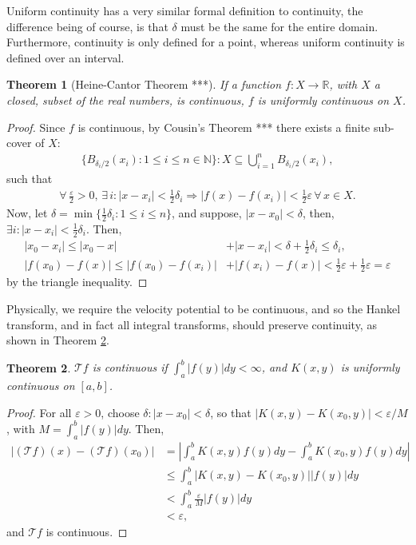 \documentclass[12pt]{article}
\newtheorem{theorem}{Theorem}[section]
\begin{document}
Uniform continuity has a very similar formal definition to continuity, the difference being of course, is that  $\delta$ must be the same for the entire domain. Furthermore, continuity is only defined for a point, whereas uniform continuity is defined over an interval.

\begin{theorem}[Heine-Cantor Theorem ***]
If a function $f: X \rightarrow \mathbb{R}$, with $X$ a closed, subset of the real numbers, is continuous, $f$ is uniformly continuous on $X$.
\label{thm:uniform}
\end{theorem}
\begin{proof}
Since $f$ is continuous, by Cousin's Theorem *** there exists a finite sub-cover of $X$:
\begin{align*}
\{ B_{\delta_i/2} (x_i) : 1 \leq i \leq n \in \mathbb{N} \} : X \subseteq \bigcup_{i=1}^n B_{\delta_i/2}(x_i),
\end{align*}
such that
\begin{align*}
\forall \, \frac{\varepsilon}{2} > 0, \, \exists \, i : |x-x_i| < \frac{1}{2} \delta_i \Rightarrow |f(x)-f(x_i)| < \frac{1}{2}\varepsilon \, \forall \, x \in X.
\end{align*}
Now, let $\delta = \min \{ \frac{1}{2} \delta_i : 1 \leq i \leq n \}$, and suppose, $|x-x_0| < \delta$, then, $\exists i : |x-x_i| < \frac{1}{2}\delta_i$.  Then,
\begin{align*}
|x_0-x_i| \leq |x_0-x| &+ |x-x_i| < \delta + \frac{1}{2}\delta_i \leq \delta_i, \\
|f(x_0)-f(x)| \leq |f(x_0)-f(x_i)| &+ |f(x_i)-f(x)| < \frac{1}{2}\varepsilon + \frac{1}{2}\varepsilon = \varepsilon
\end{align*}
by the triangle inequality.
\end{proof}

Physically, we require the velocity potential to be continuous, and so the Hankel transform, and in fact all integral transforms, should preserve continuity, as shown in Theorem \ref{thm:continuity}.

\begin{theorem}
\label{thm:continuity}
$\mathcal{T}f$ is continuous if $\int_a^b |f(y)| dy < \infty$, and $K(x,y)$ is uniformly continuous on $[a,b]$.
\end{theorem}
\begin{proof}
For all $\varepsilon > 0$, choose $\delta : |x - x_0| < \delta$, so that $|K(x,y) - K(x_0,y)| < \varepsilon/M$, with $M = \int_a^b |f(y)| dy$. Then,
\begin{align*}
|(\mathcal{T}f)(x) - (\mathcal{T}f)(x_0)| &= \left| \int_a^b K(x,y)f(y) dy - \int_a^b K(x_0,y)f(y) dy \right| \\
&\leq \int_a^b |K(x,y) - K(x_0,y)||f(y)| dy \\
&< \int_a^b \frac{\varepsilon}{M} |f(y)| dy \\
&< \varepsilon,
\end{align*}
and $\mathcal{T}f$ is continuous.
\end{proof}
\end{document}
